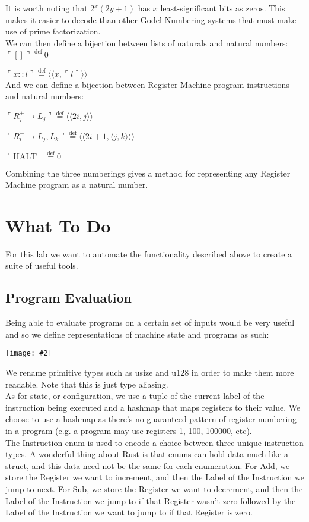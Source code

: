 \documentclass{report}
\newcommand{\centerimg}[2]{\begin{center}\texttt{[image: \#2]}\end{center}}
\newcommand*{\defeq}{\stackrel{\text{def}}{=}}
\begin{document}
It is worth noting that $2^x(2y+1)$ has $x$ least-significant bits as zeros. 
This makes it easier to decode than other Godel Numbering systems that must 
make use of prime factorization.\\

We can then define a bijection between lists of naturals and natural numbers:
$ \ulcorner [] \urcorner \defeq 0$

$ \ulcorner x::l \urcorner \defeq \langle\langle x,\ulcorner l \urcorner \rangle\rangle$\\

And we can define a bijection between Register Machine program instructions and 
natural numbers:

$ \ulcorner R^+_i \to L_j \urcorner \defeq \langle\langle 2i,j \rangle\rangle$

$ \ulcorner R^-_i \to L_j,L_k \urcorner \defeq \langle\langle 2i+1,\langle j,k \rangle \rangle\rangle$

$ \ulcorner \text{HALT} \urcorner \defeq 0 $

Combining the three numberings gives a method for representing any Register Machine
program as a natural number.

\section*{What To Do}
For this lab we want to automate the functionality described above to create a
suite of useful tools.

\subsection*{Program Evaluation}
Being able to evaluate programs on a certain set of inputs would be very useful
and so we define representations of machine state and programs as such:
\centerimg{width=\textwidth}{ProgramTypes}
We rename primitive types such as usize and u128 in order to make them more readable.
Note that this is just type aliasing. \\


As for state, or configuration, we use a
tuple of the current label of the instruction being executed and a hashmap that
maps registers to their value. We choose to use a hashmap as there's no guaranteed
pattern of register numbering in a program (e.g. a program may use registers 1, 100, 100000, etc).\\


The Instruction enum is used to encode a choice between three unique instruction types.
A wonderful thing about Rust is that enums can hold data much like a struct, and
this data need not be the same for each enumeration. For Add, we store the Register we
want to increment, and then the Label of the Instruction we jump to next. For Sub,
we store the Register we want to decrement, and then the Label of the Instruction we 
jump to if that Register wasn't zero followed by the Label of the Instruction we want to
jump to if that Register is zero.\\
\end{document}
